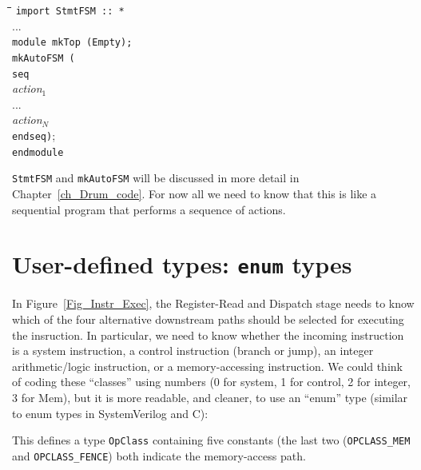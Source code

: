 {\footnotesize
\begin{tabbing}
\hmmm \= \hm \= \hm \= \hm \= \kill
      \> {\tt import StmtFSM :: *} \\
      \> ... \\
      \> {\tt module mkTop (Empty);} \\
      \>     \> {\tt mkAutoFSM (} \\
      \>     \>     \> {\tt seq} \\
      \>     \>     \>     \> \emph{action$_1$} \\
      \>     \>     \>     \> ... \\
      \>     \>     \>     \> \emph{action$_N$} \\
      \>     \>     \> {\tt endseq)}; \\
      \> {\tt endmodule}
\end{tabbing}}

{\tt StmtFSM} and \verb|mkAutoFSM| will be discussed in more detail in
Chapter~\ref{ch_Drum_code}.  For now all we need to know that this is
like a sequential program that performs a sequence of actions.




\section{User-defined types: {\tt enum} types}

\label{BSV_enum_types}


In Figure~\ref{Fig_Instr_Exec}, the Register-Read and Dispatch stage
needs to know which of the four alternative downstream paths should be
selected for executing the insruction.  In particular, we need to know
whether the incoming instruction is a system instruction, a control
instruction (branch or jump), an integer arithmetic/logic instruction,
or a memory-accessing instruction.  We could think of coding these
``classes'' using numbers (0 for system, 1 for control, 2 for integer,
3 for Mem), but it is more readable, and cleaner, to use an ``enum''
type (similar to enum types in SystemVerilog and C):


This defines a type \verb|OpClass| containing five constants (the last
two (\verb|OPCLASS_MEM| and \verb|OPCLASS_FENCE|) both indicate the
memory-access path.

